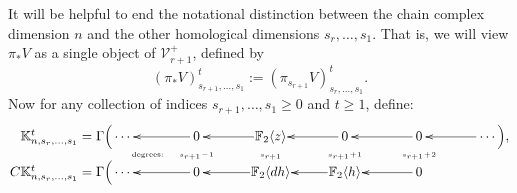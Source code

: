 \documentclass[11pt]{amsart}
\theoremstyle{plain}
\theoremstyle{definition}
\newcommand{\calV}{\mathcal{V}}
\theoremstyle{plain}
\newcommand{\vect}[2]{\calV^{#1}_{#2}}
\newcommand{\F}{\mathbb{F}}
\newcommand{\complexes}{\textup{ch}_+}
\newcommand{\Ftwo}{\F_2}
\begin{document}
\begin{Conventions and notation}
It will be helpful to end the notational distinction between the chain complex dimension $n$ and the other homological dimensions $s_r,\ldots,s_1$. That is, we will view $\pi_*V$ as a single object of $\vect{+}{r+1}$, defined by
\[(\pi_*V)^t_{s_{r+1},\ldots,s_1}:=(\pi_{s_{r+1}}V)^t_{s_{r},\ldots,s_1}.\]
Now for any collection of indices $s_{r+1},\ldots,s_1\geq0$ and $t\geq1$, define:
\begin{gather*}
\phantom{C\mathbb{K}_{n,s_r,\ldots,s_1}^t=\Gamma\Bigl(}\xymatrix@R=0mm@1@!C{
{\makebox[0cm][r]{$\,\mathbb{K}_{n,s_r,\ldots,s_1}^t=\Gamma\Bigl($}\cdots\,} &%
{\,0\,}\ar[l]
&%
\Ftwo \langle z\rangle\ar[l]
&%
{\,0\,}\ar[l]
&{\,0\,}\ar[l]
&{\,\cdots\Bigr),} \ar[l]
\\
&\raisebox{.4mm}{\tiny\makebox[0cm][r]{degrees:\ \ \ \ \ }$\smash{s_{r+1}\!-\!1}$}
&\raisebox{.4mm}{\tiny$\smash{s_{r+1}  }$}
&\raisebox{.4mm}{\tiny$\smash{s_{r+1}\!+\!1}$}
&\raisebox{.4mm}{\tiny$\smash{s_{r+1}\!+\!2}$}\\
{\makebox[0cm][r]{$\,C\mathbb{K}_{n,s_r,\ldots,s_1}^t=\Gamma\Bigl($}\cdots\,} &%
{\,0\,}\ar[l]
&%
\Ftwo \langle dh\rangle\ar[l]
&%
\Ftwo \langle h\rangle\ar[l]
&{\,0\,}\ar[l]
}
\end{gather*}
\end{Conventions and notation}
\end{document}
